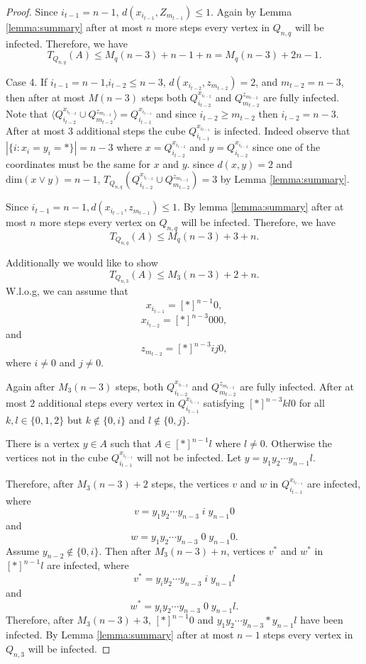 \documentclass[10pt,a4paper]{amsart}
\renewcommand{\geq}{\geqslant}
\renewcommand{\leq}{\leqslant}
\begin{document}
\begin{proof}
Since $i_{t-1}=n-1$, $d(x_{i_{t-1}},Z_{m_{t-1}}) \leq 1$. Again by Lemma \ref{lemma:summary} after at most $n$ more steps every vertex in $Q_{n,q}$ will be infected. Therefore, we have 
$$T_{Q_{n,q}}(A) \leq M_q(n-3)+n-1+n=M_q(n-3)+2n-1.$$

Case 4. If $i_{t-1}=n-1$,$i_{t-2} \leq n-3$, $d(x_{i_{t-2}},z_{m_{t-2}})=2$, and $m_{t-2}=n-3$, then after at most $M(n-3)$ steps both $Q_{i_{t-2}}^{x_{i_{t-2}}}$ and $Q_{m_{t-2}}^{z_{m_{t-2}}}$ are fully infected. Note that $\langle Q_{i_{t-2}}^{x_{i_{t-2}}} \cup Q_{m_{t-2}}^{z_{m_{t-2}}} \rangle=Q_{i_{t-1}}^{x_{i_{t-1}}}$ and since $i_{t-2} \geq m_{t-2}$ then $i_{t-2}=n-3$. After at most 3 additional steps the cube $Q_{i_{t-1}}^{x_{i_{t-1}}}$ is infected. Indeed observe that $|\{i: x_i=y_i=\ast\}| =n-3$ where $x= Q_{i_{t-2}}^{x_{i_{t-2}}}$ and $y= Q_{i_{t-2}}^{x_{i_{t-2}}}$ since one of the coordinates must be the same for $x$ and $y$. since $d(x,y)=2$ and $\text{dim}(x \vee y)=n-1$, $T_{Q_{n,q}}(Q_{i_{t-2}}^{x_{i_{t-2}}} \cup Q_{m_{t-2}}^{z_{m_{t-2}}})=3$ by Lemma \ref{lemma:summary}.

Since $i_{t-1}=n-1, d(x_{i_{t-1}},z_{m_{t-1}}) \leq 1$. By lemma \ref{lemma:summary} after at most $n$ more steps every vertex on $Q_{n,q}$ will be infected. Therefore, we have 
$$T_{Q_{n,q}}(A) \leq M_q(n-3)+3+n.$$

Additionally we would like to show 
$$T_{Q_{n,3}}(A) \leq M_3(n-3)+2+n.$$
W.l.o.g, we can assume that 
$$x_{i_{t-1}}=[\ast]^{n-1}0,$$
$$x_{i_{t-2}}=[\ast]^{n-3}000,$$
and 
$$z_{m_{t-2}}=[\ast]^{n-3}ij0,$$
where $i \neq 0$ and $j \neq 0$.

Again after $M_3(n-3)$ steps, both $Q_{i_{t-2}}^{x_{i_{t-2}}}$ and $Q_{m_{t-2}}^{z_{m_{t-2}}}$ are fully infected. After at most 2 additional steps every vertex in $Q_{i_{t-1}}^{x_{i_{t-1}}}$ satisfying $[\ast]^{n-3}kl0$ for all $k,l\in \{0,1,2\}$ but $k \notin \{0,i\}$ and $l \notin \{0,j\}$. 

There is a vertex $y \in A$ such that $A \in [\ast]^{n-1}l$ where $l \neq 0$. Otherwise the vertices not in the cube $Q_{i_{t-1}}^{x_{i_{t-1}}}$ will not be infected. Let $y=y_1y_2 \cdots y_{n-1}l$.

Therefore, after $M_3(n-3)+2$ steps, the vertices $v$ and $w$ in $Q_{i_{t-1}}^{x_{i_{t-1}}}$ are infected, where 
$$v=y_1y_2\cdots y_{n-3}\;i\;y_{n-1}0$$
and 
$$w=y_1y_2\cdots y_{n-3}\;0\; y_{n-1}0.$$
Assume $y_{n-2} \notin \{0,i\}$. Then after $M_3(n-3)+n$, vertices $v^*$ and $w^*$ in $[\ast]^{n-1}l$ are infected, where 
$$v^*=y_iy_2 \cdots y_{n-3}\;i\;y_{n-1}l$$
and 
$$w^*=y_iy_2 \cdots y_{n-3}\;0\;y_{n-1}l. $$
Therefore, after $M_3(n-3)+3$, $[\ast]^{n-1}0$ and $y_1y_2\cdots y_{n-3}\ast y_{n-1}l$ have been infected. By Lemma \ref{lemma:summary} after at most $n-1$ steps every vertex in $Q_{n,3}$ will be infected. 


\end{proof}
\end{document}
